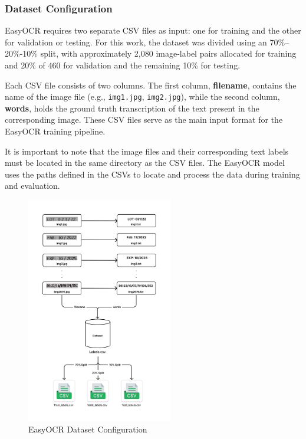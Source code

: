 \subsubsection{Dataset Configuration}
EasyOCR requires two separate CSV files as input: one for training and the other for validation or testing. For this work, the dataset was divided using an 70\%–20\%-10\% split, with approximately 2,080 image-label pairs allocated for training and 20\% of 460 for validation and the remaining 10\% for testing.

Each CSV file consists of two columns. The first column, \textbf{filename}, contains the name of the image file (e.g., \texttt{img1.jpg}, \texttt{img2.jpg}), while the second column, \textbf{words}, holds the ground truth transcription of the text present in the corresponding image. These CSV files serve as the main input format for the EasyOCR training pipeline.

It is important to note that the image files and their corresponding text labels must be located in the same directory as the CSV files. The EasyOCR model uses the paths defined in the CSVs to locate and process the data during training and evaluation.

\begin{figure}[H]
    \centering
    \includegraphics[width=0.57\textwidth]{Figures/Chapter 3/easyocr_dataset.png}
    \caption{EasyOCR Dataset Configuration}
    \label{fig:easyocrdatasetConfiguration}
\end{figure}


